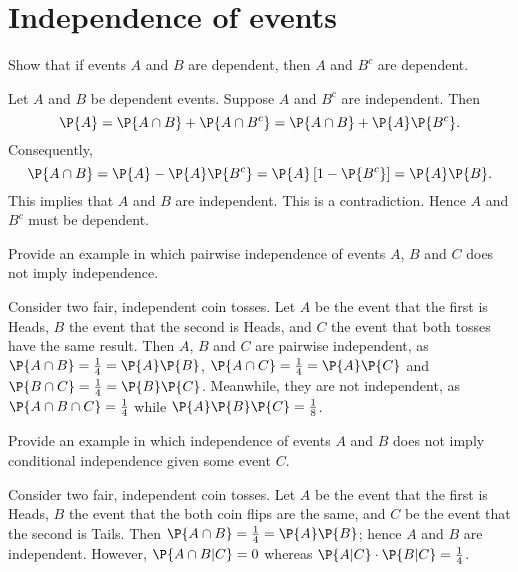 \section{Independence of events}
\label{sec:section-2.2}
	
	\begin{exercise}
		Show that if events $A$ and $B$ are dependent, then $A$ and $B^c$ are dependent.
		\begin{solution}
			Let $A$ and $B$ be dependent events. Suppose $A$ and $B^c$ are independent. Then
			\begin{equation*}
				\P{A} = \P{A \cap B} + \P{A \cap B^c} = \P{A \cap B} + \P{A}\P{B^c}.
			\end{equation*}
			Consequently,
			\begin{equation*}
				\P{A \cap B} = \P{A} - \P{A} \P{B^c} = \P{A} \left[1 - \P{B^c}\right] = \P{A} \P{B}.
			\end{equation*}
			This implies that $A$ and $B$ are independent. This is a contradiction. Hence $A$ and $B^c$ must be dependent.
		\end{solution}
	\end{exercise}
	
	\begin{exercise}
		Provide an example in which pairwise independence of events $A$, $B$ and $C$ does not imply independence.
		\begin{solution}
			Consider two fair, independent coin tosses. Let $A$ be the event that the first is Heads, $B$ the event that the second is Heads, and $C$ the event that both tosses have the same result. Then $A$, $B$ and $C$ are pairwise independent, as $\P{A \cap B} = \frac{1}{4} = \P{A} \P{B}$, $\P{A \cap C} = \frac{1}{4} = \P{A} \P{C}$ and $\P{B \cap C} = \frac{1}{4} = \P{B} \P{C}$. Meanwhile, they are not independent, as $\P{A \cap B \cap C} = \frac{1}{4}$ while $\P{A} \P{B} \P{C} = \frac{1}{8}$.
		\end{solution}
	\end{exercise}

	\begin{exercise}
		Provide an example in which independence of events $A$ and $B$ does not imply conditional independence given some event $C$.
		\begin{solution}
			Consider two fair, independent coin tosses. Let $A$ be the event that the first is Heads, $B$ the event that the both coin flips are the same, and $C$ be the event that the second is Tails. Then $\P{A \cap B} = \frac{1}{4} = \P{A} \P{B}$; hence $A$ and $B$ are independent. However, $\P{A \cap B | C} = 0$ whereas $\P{A | C} \cdot \P{B | C} = \frac{1}{4}$.
		\end{solution}
	\end{exercise}
	

